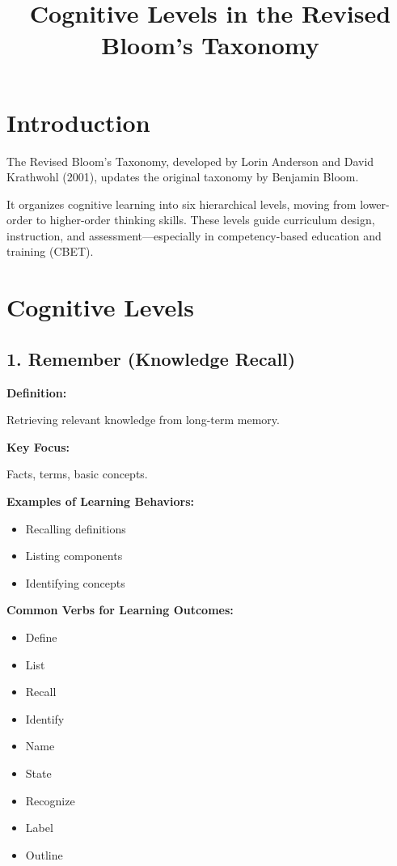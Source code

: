 \documentclass[12pt]{article}
\begin{document}
\title{Cognitive Levels in the Revised Bloom's Taxonomy}
\author{}
\date{}
\maketitle

\section{Introduction}

The Revised Bloom's Taxonomy, developed by Lorin Anderson and David Krathwohl (2001), updates the original taxonomy by Benjamin Bloom.

It organizes cognitive learning into six hierarchical levels, moving from lower-order to higher-order thinking skills. These levels guide curriculum design, instruction, and assessment—especially in competency-based education and training (CBET).

\section{Cognitive Levels}

\subsection{1. Remember (Knowledge Recall)}

\textbf{Definition:}

Retrieving relevant knowledge from long-term memory.

\textbf{Key Focus:}

Facts, terms, basic concepts.

\textbf{Examples of Learning Behaviors:}

\begin{itemize}
    \item Recalling definitions
    \item Listing components
    \item Identifying concepts
\end{itemize}

\textbf{Common Verbs for Learning Outcomes:}

\begin{itemize}
    \item Define
    \item List
    \item Recall
    \item Identify
    \item Name
    \item State
    \item Recognize
    \item Label
    \item Outline
\end{itemize}
\end{document}
